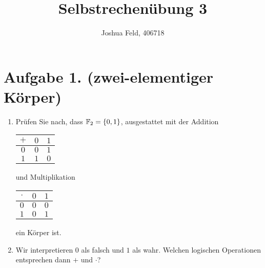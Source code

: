 \documentclass[german,12pt]{homework}
\title{Selbstrechenübung 3}
\author{Joshua Feld, 406718}
\institute{RWTH Aachen University\\Center for Computational Engineering Science}
\newcommand{\FF}{\mathbb{F}}
\DeclarePairedDelimiter{\penbrace}{\{}{\}}
\begin{document}
    \maketitle

    \section*{Aufgabe 1. (zwei-elementiger Körper)}

    \begin{problem}
        \begin{enumerate}
            \item Prüfen Sie nach, dass \(\FF_2 = \penbrace*{0, 1}\), ausgestattet mit der Addition \begin{tabular}{c|c|c}
                \(+\) & \(0\) & \(1\)\\
                \hline
                \(0\) & \(0\) & \(1\)\\
                \hline
                \(1\) & \(1\) & \(0\)
            \end{tabular} und Multiplikation \begin{tabular}{c|c|c}
                \(\cdot\) & \(0\) & \(1\)\\
                \hline
                \(0\) & \(0\) & \(0\)\\
                \hline
                \(1\) & \(0\) & \(1\)
            \end{tabular} ein Körper ist.
            \item Wir interpretieren \(0\) als falsch und \(1\) als wahr. Welchen logischen Operationen entsprechen dann \(+\) und \(\cdot\)?
        \end{enumerate}


\end{problem}
\end{document}
